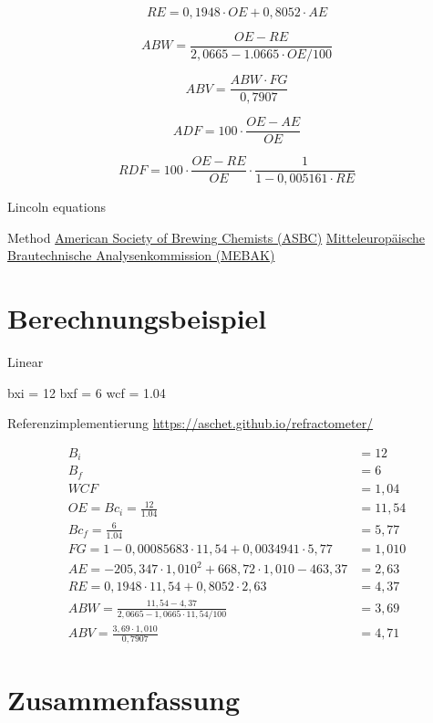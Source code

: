 \documentclass[a4paper,parskip=half]{scrartcl}
\newcommand{\bxi}{\mathit{B}_i}
\newcommand{\bxic}{\mathit{Bc}_i}
\newcommand{\bxf}{\mathit{B}_f}
\newcommand{\bxfc}{\mathit{Bc}_f}
\newcommand{\fg}{\mathit{FG}}
\newcommand{\abv}{\mathit{ABV}}
\newcommand{\abw}{\mathit{ABW}}
\newcommand{\oex}{\mathit{OE}}
\newcommand{\aex}{\mathit{AE}}
\newcommand{\rex}{\mathit{RE}}
\newcommand{\wcf}{\mathit{WCF}}
\newcommand{\adf}{\mathit{ADF}}
\newcommand{\rdf}{\mathit{RDF}}
\begin{document}
\begin{equation}
\rex = 0,1948 \cdot \oex + 0,8052 \cdot \aex
\end{equation}

\begin{equation}
\abw = \frac{\oex - \rex}{2,0665 - 1.0665 \cdot \oex / 100}
\end{equation}

\begin{equation}
\abv = \frac{\abw \cdot \fg}{0,7907}
\end{equation}

\autocite{Spedding2016}

\begin{equation}
\adf = 100 \cdot \frac{\oex - \aex}{\oex}
\end{equation}

\setlength{\jot}{2mm}

\begin{equation}
\rdf = 100 \cdot \frac{\oex - \rex}{\oex} \cdot \frac{1}{1 - 0,005161 \cdot \rex}
\end{equation}

\autocite{Speers2015}

Lincoln equations
\autocite{Spedding2016}

Method \href{https://www.asbcnet.org}{American Society of Brewing Chemists (ASBC)} \href{https://www.mebak.org}{Mitteleuropäische Brautechnische Analysenkommission (MEBAK)}

\section*{Berechnungsbeispiel}

Linear

bxi = 12
bxf = 6
wcf = 1.04

Referenzimplementierung \url{https://aschet.github.io/refractometer/}


\begin{align*}
\bxi &= 12 \\
\bxf &= 6 \\
\wcf &= 1,04 \\
\oex = \bxic = \frac{12}{1.04} &= 11,54 \\
\bxfc = \frac{6}{1.04} &= 5,77 \\
\fg = 1 - 0,00085683 \cdot 11,54 + 0,0034941 \cdot 5,77 &= 1,010 \\
\aex = -205,347 \cdot 1,010^2 + 668,72 \cdot 1,010 - 463,37 &= 2,63 \\
\rex = 0,1948 \cdot 11,54 + 0,8052 \cdot 2,63 &= 4,37 \\
\abw = \frac{11,54 - 4,37}{2,0665 - 1,0665 \cdot 11,54 / 100} &= 3,69 \\
\abv = \frac{3,69 \cdot 1,010}{0,7907} &= 4,71
\end{align*}

\section*{Zusammenfassung}

\printbibliography[title=Quellen]
\end{document}
